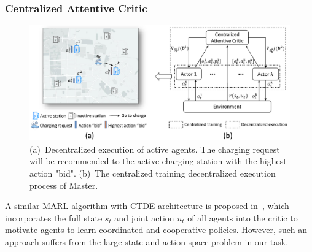 \documentclass[sigconf]{acmart}
\newcommand{\hao}[1]{{\color{black}{#1}}}
\newcommand{\stddpg}{{\sc Master}\xspace}
\begin{document}
\subsubsection{\textbf{Centralized Attentive Critic}}\label{sec:centralized}
\begin{figure}[tb]
	\centering
	\hspace{-2mm}
	\includegraphics[width=1\columnwidth]{figs/_framework.pdf}
	\caption{(a)~Decentralized execution of active agents. The charging request will be recommended to the active charging station with the highest action "bid". (b)~The centralized training decentralized execution process of \stddpg. }
	\label{fig:overall}
\end{figure}

\hao{To motivate the agents to make recommendations cooperatively, we devise the multi-agent actor-critic framework with a centralized attentive critic for deterministic policies learning.} 
A similar MARL algorithm with CTDE architecture is proposed in~\cite{lowe2017multi}, which incorporates the full state $s_t$ and joint action $u_t$ of all agents into the critic to motivate agents to learn coordinated and cooperative policies. However, such an approach suffers from the large state and action space problem in our task.
\end{document}
